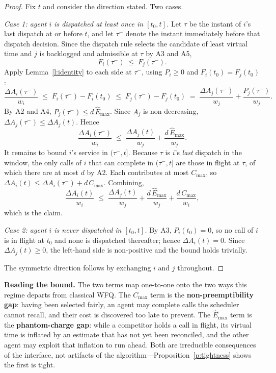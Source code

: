 \documentclass[letterpaper,11pt,leqno]{article}
\begin{document}
\begin{proof}
Fix $t$ and consider the direction stated. Two cases.

\emph{Case 1: agent $i$ is dispatched at least once in $[t_0, t]$.} Let $\tau$ be the instant of $i$'s last dispatch at or before $t$, and let $\tau^-$ denote the instant immediately before that dispatch decision. Since the dispatch rule selects the candidate of least virtual time and $j$ is backlogged and admissible at $\tau$ by A3 and A5,
\[
  F_i(\tau^-) \;\le\; F_j(\tau^-).
\]
Apply Lemma~\ref{l:identity} to each side at $\tau^-$, using $P_i \ge 0$ and $F_i(t_0) = F_j(t_0)$:
\[
  \frac{\Delta A_i(\tau^-)}{w_i} \;\le\; F_i(\tau^-) - F_i(t_0)
  \;\le\; F_j(\tau^-) - F_j(t_0)
  \;=\; \frac{\Delta A_j(\tau^-)}{w_j} + \frac{P_j(\tau^-)}{w_j}.
\]
By A2 and A4, $P_j(\tau^-) \le d\,\hat{E}_{\max}$. Since $A_j$ is non-decreasing, $\Delta A_j(\tau^-) \le \Delta A_j(t)$. Hence
\[
  \frac{\Delta A_i(\tau^-)}{w_i} \;\le\; \frac{\Delta A_j(t)}{w_j} + \frac{d\,\hat{E}_{\max}}{w_j}.
\]
It remains to bound $i$'s service in $(\tau^-, t]$. Because $\tau$ is $i$'s \emph{last} dispatch in the window, the only calls of $i$ that can complete in $(\tau^-, t]$ are those in flight at $\tau$, of which there are at most $d$ by A2. Each contributes at most $C_{\max}$, so $\Delta A_i(t) \le \Delta A_i(\tau^-) + d\,C_{\max}$. Combining,
\[
  \frac{\Delta A_i(t)}{w_i} \;\le\; \frac{\Delta A_j(t)}{w_j} + \frac{d\,\hat{E}_{\max}}{w_j} + \frac{d\,C_{\max}}{w_i},
\]
which is the claim.

\emph{Case 2: agent $i$ is never dispatched in $[t_0, t]$.} By A3, $P_i(t_0) = 0$, so no call of $i$ is in flight at $t_0$ and none is dispatched thereafter; hence $\Delta A_i(t) = 0$. Since $\Delta A_j(t) \ge 0$, the left-hand side is non-positive and the bound holds trivially.

The symmetric direction follows by exchanging $i$ and $j$ throughout.
\end{proof}

\textbf{Reading the bound.} The two terms map one-to-one onto the two ways this regime departs from classical WFQ. The $C_{\max}$ term is the \textbf{non-preemptibility gap}: having been selected fairly, an agent may complete calls the scheduler cannot recall, and their cost is discovered too late to prevent. The $\hat{E}_{\max}$ term is the \textbf{phantom-charge gap}: while a competitor holds a call in flight, its virtual time is inflated by an estimate that has not yet been reconciled, and the other agent may exploit that inflation to run ahead. Both are irreducible consequences of the interface, not artifacts of the algorithm---Proposition~\ref{p:tightness} shows the first is tight.
\end{document}

